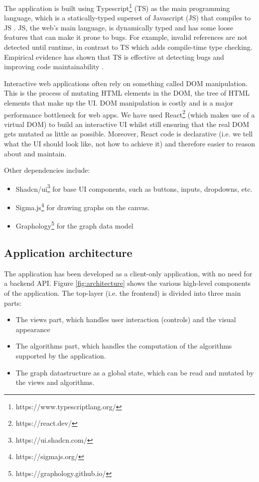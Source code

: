 \documentclass{l4proj}
\begin{document}
The application is built using Typescript\footnote{https://www.typescriptlang.org/} (TS) as the main programming language, which is a statically-typed superset of Javascript (JS) that compiles to JS \citep{typescript}.
JS, the web's main language, is dynamically typed and has some loose features that can make it prone to bugs. For example, invalid references are not detected until runtime, in contrast to TS which adds compile-time type checking.
Empirical evidence has shown that TS is effective at detecting bugs and improving code maintainability \citep{typescript_bugs_paper}.

Interactive web applications often rely on something called DOM manipulation. This is the process of mutating HTML elements in the DOM, the tree of HTML elements that make up the UI. DOM manipulation is costly and is a major performance bottleneck for web apps.
We have used React\footnote{https://react.dev/} (which makes use of a virtual DOM) to build an interactive UI whilst still ensuring that the real DOM gets mutated as little as possible.
Moreover, React code is declarative (i.e. we tell what the UI should look like, not how to achieve it) and therefore easier to reason about and maintain.

Other dependencies include:
\begin{itemize}
    \item Shadcn/ui\footnote{https://ui.shadcn.com/} for base UI components, such as buttons, inputs, dropdowns, etc.
    \item Sigma.js\footnote{https://sigmajs.org/} for drawing graphs on the canvas.
    \item Graphology\footnote{https://graphology.github.io/} for the graph data model
\end{itemize}

\subsection{Application architecture}
The application has been developed as a client-only application, with no need for a backend API. Figure \ref{fig:architecture} shows the various high-level components of the application. The top-layer (i.e. the frontend) is divided into three main parts:
\begin{itemize}
    \item The views part, which handles user interaction (controls) and the visual appearance
    \item The algorithms part, which handles the computation of the algorithms supported by the application.
    \item The graph datastructure as a global state, which can be read and mutated by the views and algorithms.
\end{itemize}
\end{document}
